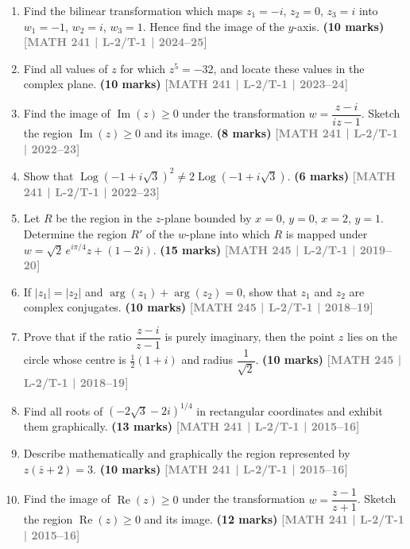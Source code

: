\documentclass[12pt,a4paper]{article}
\newcommand{\yr}[1]{\hfill\textcolor{gray}{\small\textbf{[#1]}}}
\newcommand{\mk}[1]{\textcolor{orange!70!black}{\small\textbf{(#1 marks)}}}
\begin{document}
\begin{enumerate}\item Find the bilinear transformation which maps $z_{1}=-i$, $z_{2}=0$, $z_{3}=i$ into $w_{1}=-1$, $w_{2}=i$, $w_{3}=1$. Hence find the image of the $y$-axis.
\mk{10} \yr{MATH 241 | L-2/T-1 | 2024--25}

\item Find all values of $z$ for which $z^{5}=-32$, and locate these values in the complex plane.
\mk{10} \yr{MATH 241 | L-2/T-1 | 2023--24}

\item Find the image of $\operatorname{Im}(z)\ge 0$ under the transformation $w=\dfrac{z-i}{iz-1}$. Sketch the region $\operatorname{Im}(z)\ge 0$ and its image.
\mk{8} \yr{MATH 241 | L-2/T-1 | 2022--23}

\item Show that $\operatorname{Log}(-1+i\sqrt{3})^{2}\neq 2\operatorname{Log}(-1+i\sqrt{3})$.
\mk{6} \yr{MATH 241 | L-2/T-1 | 2022--23}

\item Let $R$ be the region in the $z$-plane bounded by $x=0$, $y=0$, $x=2$, $y=1$. Determine the region $R'$ of the $w$-plane into which $R$ is mapped under $w=\sqrt{2}\,e^{i\pi/4}z+(1-2i)$.
\mk{15} \yr{MATH 245 | L-2/T-1 | 2019--20}

\item If $|z_{1}|=|z_{2}|$ and $\arg(z_{1})+\arg(z_{2})=0$, show that $z_{1}$ and $z_{2}$ are complex conjugates.
\mk{10} \yr{MATH 245 | L-2/T-1 | 2018--19}

\item Prove that if the ratio $\dfrac{z-i}{z-1}$ is purely imaginary, then the point $z$ lies on the circle whose centre is $\tfrac{1}{2}(1+i)$ and radius $\dfrac{1}{\sqrt{2}}$.
\mk{10} \yr{MATH 245 | L-2/T-1 | 2018--19}

\item Find all roots of $(-2\sqrt{3}-2i)^{1/4}$ in rectangular coordinates and exhibit them graphically.
\mk{13} \yr{MATH 241 | L-2/T-1 | 2015--16}

\item Describe mathematically and graphically the region represented by $z(\bar{z}+2)=3$.
\mk{10} \yr{MATH 241 | L-2/T-1 | 2015--16}

\item Find the image of $\operatorname{Re}(z)\ge 0$ under the transformation $w=\dfrac{z-1}{z+1}$. Sketch the region $\operatorname{Re}(z)\ge 0$ and its image.
\mk{12} \yr{MATH 241 | L-2/T-1 | 2015--16}


\end{enumerate}
\end{document}

